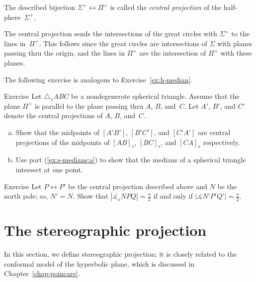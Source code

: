 The described bijection $\Sigma^+\leftrightarrow \Pi^+$ is called the \emph{central projection} of 
the half-phere~$\Sigma^+$.

The central projection sends the intersections of the great circles with $\Sigma^+$ to the lines in~$\Pi^+$.
This follows since the great circles are intersections of $\Sigma$ with planes passing thru the origin,
and the lines in $\Pi^+$ are the intersection of $\Pi^+$ with these planes.

The following exercise 
is analogous to Exercise~\ref{ex:h-median}.

\begin{thm}{Exercise}\label{ex:s-medians}
Let $\triangle_sABC$ be a nondegenerate spherical triangle.
Assume that the plane $\Pi^+$ is parallel to the plane passing thru $A$, $B$, and~$C$.
Let $A'$, $B'$, and $C'$ denote the central projections of $A$, $B$, and~$C$.
\begin{enumerate}[(a)]
\item\label{ex:s-medians:a} Show that the midpoints of $[A'B']$, $[B'C']$, and $[C'A']$
are central projections of the midpoints of $[AB]_s$, $[BC]_s$, and $[CA]_s$ respectively.
\item\label{ex:s-medians:b} Use part (\ref{ex:s-medians:a}) to show that the medians of a spherical triangle intersect at one point.
\end{enumerate}

\end{thm}


\begin{thm}{Exercise}\label{ex:s-altitudes}
Let $P\leftrightarrow P'$ be the central projection described above
and $N$ be the north pole; so, $N'=N$.
Show that $|\measuredangle_s NPQ|=\tfrac\pi2$ if and only if $|\measuredangle N'P'Q'|=\tfrac\pi2$.
\end{thm}

\section{The stereographic projection}

In this section, we define stereographic projection;
it is closely related to the conformal model of the hyperbolic plane, which is discussed in Chapter~\ref{chap:poincare}.

